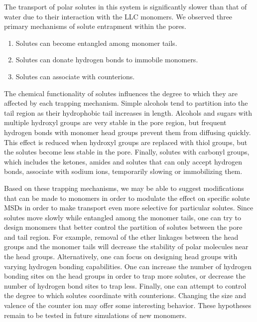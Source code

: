 \documentclass[journal=jpcbfk,manuscript=article]{achemso}
\begin{document}
  The transport of polar solutes in this system is significantly slower than
  that of water due to their interaction with the LLC monomers. We observed 
  three primary mechanisms of solute entrapment within the pores.
  \begin{enumerate}
    \item Solutes can become entangled among monomer tails. 
    \item Solutes can donate hydrogen bonds to immobile monomers.
    \item Solutes can associate with counterions.
  \end{enumerate}
  
  The chemical functionality of solutes influences the degree to which
  they are affected by each trapping mechanism. Simple alcohols tend to
  partition into the tail region as their hydrophobic tail increases in length.
  Alcohols and sugars with multiple hydroxyl groups are very stable
  in the pore region, but frequent hydrogen bonds with monomer head 
  groups prevent them from diffusing quickly. This effect is reduced when
  hydroxyl groups are replaced with thiol groups, but the solutes become less
  stable in the pore. Finally, solutes with carbonyl groups, which includes
  the ketones, amides and solutes that can only accept hydrogen bonds, associate
  with sodium ions, temporarily slowing or immobilizing them. 
  
  Based on these trapping mechanisms, we 
  may be able to suggest
  modifications that
  can be made to monomers in order to 
  modulate the effect on specific solute MSDs in order to make transport even more 
  selective for particular solutes.
  Since solutes move slowly while entangled among the monomer
  tails, one can try to design monomers that better control the partition
  of solutes between the pore and tail region. For example, removal of the 
  ether linkages between the head groups and the monomer tails will decrease
  the stability of polar molecules near the head groups. Alternatively, one
  can focus on designing head groups with varying hydrogen bonding capabilities.
  One can increase the number of hydrogen bonding sites on the head groups
  in order to trap more solutes, or decrease the number of hydrogen bond sites
  to trap less. Finally, one can attempt to control the degree to which solutes
  coordinate with counterions. Changing the size and valence of the counter 
  ion may offer some interesting behavior. These hypotheses remain to be 
  tested in future simulations of new monomers.
  
\end{document}
